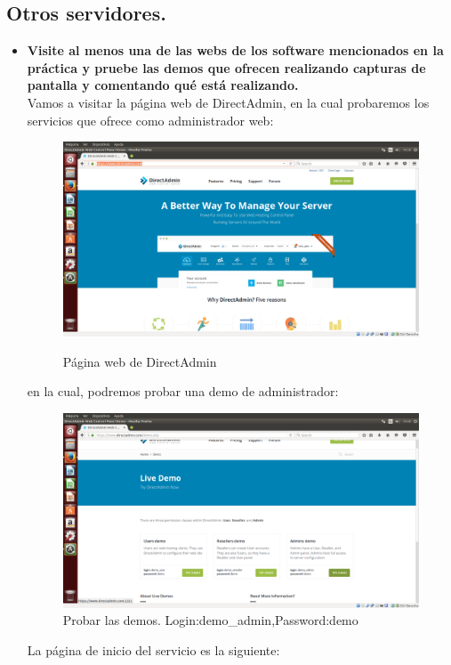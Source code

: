 \subsection{Otros servidores.}
	\begin{itemize}
		\item  \textbf{Visite al menos una de las webs de los software mencionados en la práctica y pruebe las demos que ofrecen realizando capturas de pantalla y comentando qué está	realizando.}\\
		
		Vamos a visitar la página web de DirectAdmin\cite{directadmin}, en la cual probaremos los servicios que ofrece como administrador web:\\
		
		\begin{figure}[H]
			\centering
			\includegraphics[width=0.7\linewidth]{directadminWeb}
			\caption[Web de DirectAdmin]{Página web de DirectAdmin}
			\caption{}
			\label{fig:directadminWeb}
		\end{figure}
		en la cual, podremos probar una demo de administrador:\\
		
		\begin{figure}[H]
			\centering
			\includegraphics[width=0.7\linewidth]{DirectAdminTryDemo}
			\caption[Try demo DirectAdmin]{Probar las demos. Login:demo\_admin,Password:demo}
			\label{fig:DirectAdminTryDemo}
		\end{figure}
		
		La página de inicio del servicio es la siguiente:\\
		

\end{itemize}
